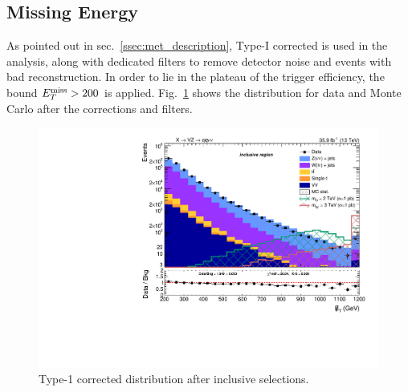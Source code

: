 
\subsection{Missing Energy}
As pointed out in sec.~\ref{ssec:met_description}, Type-I corrected \MET is used in the analysis, along with dedicated filters to remove detector noise and events with bad reconstruction. In order to lie in the plateau of the trigger efficiency, the bound $E_T^{\text{miss}} > 200$ \GeV is applied. Fig.~\ref{fig:type1_met} shows the \MET distribution for data and Monte Carlo after the corrections and filters.
 
 \begin{figure}[!htb]
   \centering
     \includegraphics[width=.495\textwidth]{plots/v9_thesis/XVZnnInc/MEt_pt.pdf}
   
   \caption{Type-1 corrected \MET distribution after inclusive selections.}
   \label{fig:type1_met}
 \end{figure}



